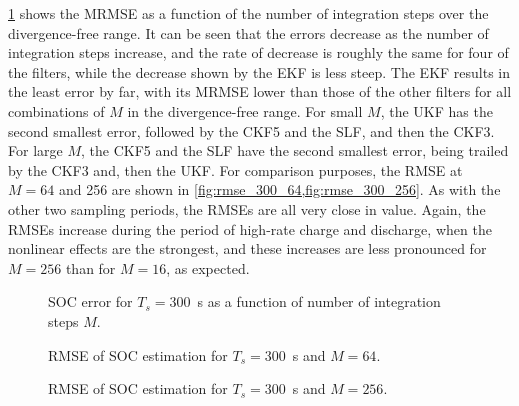 \documentclass[../zhang_thesis.tex]{subfiles}
\begin{document}
\cref{fig:mrmse_300} shows the MRMSE as a function of the number of integration steps over the divergence-free range. It can be seen that the errors decrease as the number of integration steps increase, and the rate of decrease is roughly the same for four of the filters, while the decrease shown by the EKF is less steep. The EKF results in the least error by far, with its MRMSE lower than those of the other filters for all combinations of $M$ in the divergence-free range. For small $M$, the UKF has the second smallest error, followed by the CKF5 and the SLF, and then the CKF3. For large $M$, the CKF5 and the SLF have the second smallest error, being trailed by the CKF3 and, then the UKF. For comparison purposes, the RMSE at $M=64$ and 256 are shown in \cref{fig:rmse_300_64,fig:rmse_300_256}. As with the other two sampling periods, the RMSEs are all very close in value. Again, the RMSEs increase during the period of high-rate charge and discharge, when the nonlinear effects are the strongest, and these increases are less pronounced for $M=256$ than for $M=16$, as expected.

\begin{figure}[b]
\centering

\caption{SOC error for $T_s=300$~s as a function of number of integration steps $M$.}
\label{fig:mrmse_300}
\end{figure}

\begin{figure}
\centering

\caption{RMSE of SOC estimation for $T_s=300$~s and $M=64$.}
\label{fig:rmse_300_64}
\end{figure}

\begin{figure}
\centering

\caption{RMSE of SOC estimation for $T_s=300$~s and $M=256$.}
\label{fig:rmse_300_256}
\end{figure}
\end{document}
